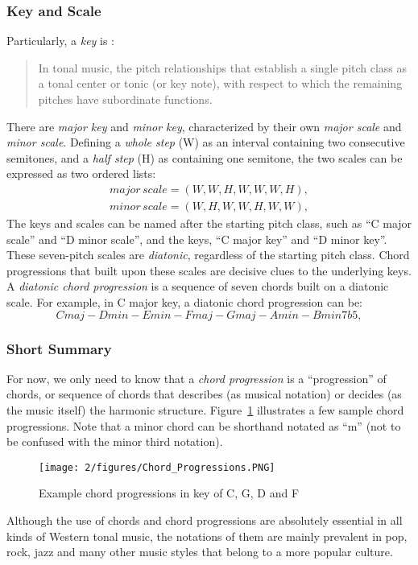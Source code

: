 \subsubsection{Key and Scale}
Particularly, a {\it key} is \cite{randel1999harvard}:
\begin{quote}
In tonal music, the pitch relationships that establish a single pitch class as a tonal center or tonic (or key note), with respect to which the remaining pitches have subordinate functions.
\end{quote}
There are {\it major key} and {\it minor key}, characterized by their own {\it major scale} and {\it minor scale}. Defining a {\it whole step} (W) as an interval containing two consecutive semitones, and a {\it half step} (H) as containing one semitone, the two scales can be expressed as two ordered lists:
\begin{equation}
\begin{split}
major\,scale=(W,W, H,W,W,W, H),\\
minor\,scale=(W,H,W,W,H,W,W),
\end{split}
\end{equation}
The keys and scales can be named after the starting pitch class, such as ``C major scale'' and ``D minor scale'', and the keys, ``C major key'' and ``D minor key''.  These seven-pitch scales are {\it diatonic}, regardless of the starting pitch class. Chord progressions that built upon these scales are decisive clues to the underlying keys. A {\it diatonic chord progression} is a sequence of seven chords built on a diatonic scale. For example, in C major key, a diatonic chord progression can be:
\begin{equation}
Cmaj - Dmin - Emin - Fmaj - Gmaj - Amin - Bmin7b5,
\end{equation}

\subsubsection{Short Summary}
For now, we only need to know that a {\it chord progression} is a ``progression'' of chords, or sequence of chords that describes (as musical notation) or decides (as the music itself) the harmonic structure. Figure~\ref{fig:2-chordprogression} illustrates a few sample chord progressions. Note that a minor chord can be shorthand notated as ``m'' (not to be confused with the minor third notation).
\begin{figure}[htb]
\centering
\texttt{[image: 2/figures/Chord\_Progressions.PNG]}
\caption{Example chord progressions in key of C, G, D and F}
\label{fig:2-chordprogression}
\end{figure}
Although the use of chords and chord progressions are absolutely essential in all kinds of Western tonal music, the notations of them are mainly prevalent in pop, rock, jazz and many other music styles that belong to a more popular culture.


